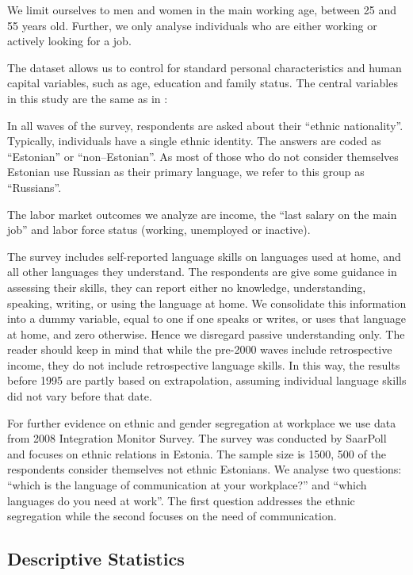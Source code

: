 \documentclass[12pt, a4paper]{article}
\begin{document}
We limit ourselves to men and women in the main working age, between 25 and
55 years old.  Further, we only analyse
individuals who are either working or actively looking for a job.

The dataset allows us to control for standard personal
characteristics and human capital variables, such as age, education
and family status.  The central variables in this study are the same
as in \citep{Leping2008}:

In all waves of the survey, respondents are asked about their
``ethnic nationality''.  Typically, individuals have a single ethnic
identity.  The answers are coded as ``Estonian'' or
``non--Estonian''.  As most of those who do not consider themselves
Estonian use Russian as their primary language, we refer to this group
as ``Russians''.                                                                    
                            
The labor market outcomes we analyze are income, the ``last salary on the main job'' and
labor force status (working, unemployed or inactive).  
                                                                   
The survey includes self-reported language skills on languages used at
home, and all other languages they understand.  The respondents are
give some guidance in assessing their skills, they can report either
no knowledge, understanding, speaking, writing, or using the
language at home.  We consolidate this information into a dummy variable, equal
to one if one speaks or writes, or uses that language at
home, and zero otherwise.  Hence we disregard passive understanding
only.
  The reader should keep in mind that while the pre-2000 waves include retrospective income, they do not include retrospective language skills. In this way, the results before
1995 are partly based on extrapolation, assuming individual language
skills did not vary before that date.

For further evidence on ethnic and gender segregation at workplace we use data
from 2008 Integration Monitor Survey.  The survey was conducted by
SaarPoll and focuses on
ethnic relations in Estonia.  The sample size is 1500,
500 of the respondents consider themselves not ethnic Estonians.  We analyse
two questions: ``which is the language of communication at your
workplace?'' and ``which languages do you need at work''.  The first
question addresses the ethnic segregation while the second focuses on
the need of communication.


\subsection{Descriptive Statistics}
\label{sec:descriptive}
\end{document}

